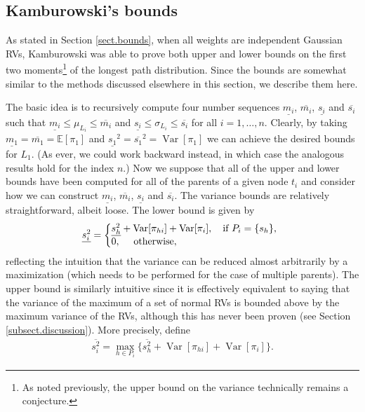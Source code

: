 \documentclass[12pt]{article}
\def\E{\mathbb{E}}
\def\Var{\operatorname{Var}}
\begin{document}
\subsection{Kamburowski's bounds}
\label{subsect.kamburowski}

As stated in Section \ref{sect.bounds}, when all weights are independent Gaussian RVs, Kamburowski was able to prove both upper and lower bounds on the first two moments\footnote{As noted previously, the upper bound on the variance technically remains a conjecture.} of the longest path distribution. Since the bounds are somewhat similar to the methods discussed elsewhere in this section, we describe them here.

The basic idea is to recursively compute four number sequences $\underline{m_i}$, $\overline{m_i}$, $\underline{s_i}$ and  $\overline{s_i}$ such that $\underline{m_i} \leq \mu_{L_i} \leq \overline{m_i}$ and $ \underline{s_i} \leq \sigma_{L_i} \leq \overline{s_i}$ for all $i = 1, \dots, n$. Clearly, by taking $\underline{m_1} = \overline{m_1} = \E[\pi_1]$ and $\underline{s_1}^2 = \overline{s_1}^2 = \Var[\pi_1]$ we can achieve the desired bounds for $L_1$. (As ever, we could work backward instead, in which case the analogous results hold for the index $n$.) Now we suppose that all of the upper and lower bounds have been computed for all of the parents of a given node $t_i$ and consider how we can construct  $\underline{m_i}$, $\overline{m_i}$, $\underline{s_i}$ and  $\overline{s_i}$. The variance bounds are relatively straightforward, albeit loose. The lower bound is given by
\begin{equation}
\underline{s_i^2} =\left\{
\begin{array}{@{}ll@{}}
\underline{s_h^2} + \Var[\pi_{hi}] + \Var[\pi_{i}], \quad  \text{if $P_i = \{s_h\}$,} \\
0,  \quad \text{ otherwise},
\end{array}\right.
\label{eq.si_under}
\end{equation}
reflecting the intuition that the variance can be reduced almost arbitrarily by a maximization (which needs to be performed for the case of multiple parents). The upper bound is similarly intuitive since it is effectively equivalent to saying that the variance of the maximum of a set of normal RVs is bounded above by the maximum variance of the RVs, although this has never been proven (see Section \ref{subsect.discussion}). More precisely, define 
\begin{align}
  \label{eq.si_over}
  \overline{s_i^2} = \max_{h \in P_i}\{ \overline{s_h^2} + \Var[\pi_{hi}] + \Var[\pi_{i}]\}.
\end{align}
\end{document}
